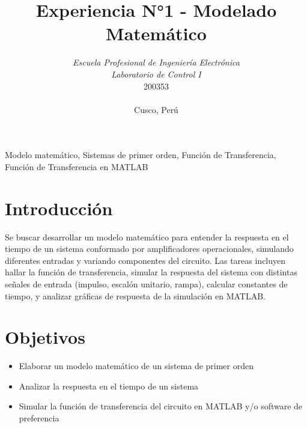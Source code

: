 \documentclass[conference]{IEEEtran}
\begin{document}
	
	\title{Experiencia N°1 - Modelado Matemático}
	\author{	
		\textit{Escuela Profesional de Ingeniería Electrónica}\\
		\textit{Laboratorio de Control I}\\
		200353 \\\\
		Cusco, Perú
	}
	
	\maketitle
	
	\begin{abstract}
		
	\end{abstract}
	
	\begin{IEEEkeywords}
		Modelo matemático, Sistemas de primer orden, Función de Transferencia, Función de Transferencia en MATLAB
	\end{IEEEkeywords}
	
	\section{Introducción}
	Se buscar desarrollar un modelo matemático para entender la respuesta en el tiempo de un sistema conformado por amplificadores operacionales, simulando diferentes entradas y variando componentes del circuito. Las tareas incluyen hallar la función de transferencia, simular la respuesta del sistema con distintas señales de entrada (impulso, escalón unitario, rampa), calcular constantes de tiempo, y analizar gráficas de respuesta de la simulación en MATLAB.
	
	\section{Objetivos}
	
	\begin{itemize}
		\item Elaborar un modelo matemático de un sistema de primer orden
		
		\item Analizar la respuesta en el tiempo de un sistema
		
		\item Simular la función de transferencia del circuito en MATLAB y/o software de preferencia
	\end{itemize}
	
\end{document}
